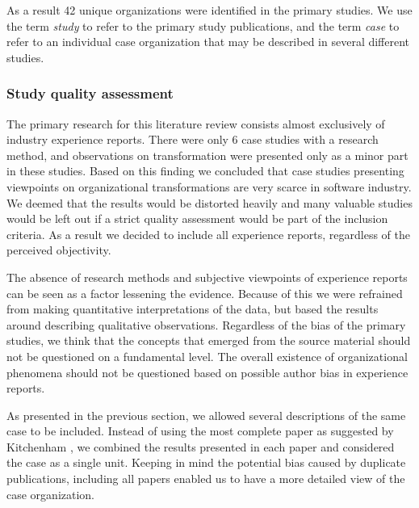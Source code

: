 As a result 42 unique organizations were identified in the primary studies. We
use the term \emph{study} to refer to the primary study publications, and the
term \emph{case} to refer to an individual case organization that may be
described in several different studies.


\subsubsection{Study quality assessment}

The primary research for this literature review consists almost exclusively of
industry experience reports. There were only 6 case studies with a research
method, and observations on transformation were presented only as a minor part
in these studies. Based on this finding we concluded that case studies
presenting viewpoints on organizational transformations are very scarce in
software industry. We deemed that the results would be distorted heavily and
many valuable studies would be left out if a strict quality assessment would be
part of the inclusion criteria. As a result we decided to include all experience
reports, regardless of the perceived objectivity.

The absence of research methods and subjective viewpoints of experience reports
can be seen as a factor lessening the evidence. Because of this we were
refrained from making quantitative interpretations of the data, but based the
results around describing qualitative observations. Regardless of the bias of
the primary studies, we think that the concepts that emerged from the source
material should not be questioned on a fundamental level. The overall existence
of organizational phenomena should not be questioned based on possible author
bias in experience reports.



% 

As presented in the previous section, we allowed several descriptions of the
same case to be included. Instead of using the most complete paper as suggested
by Kitchenham \cite{Kitchenham2007}, we combined the results presented in each
paper and considered the case as a single unit. Keeping in mind the potential
bias caused by duplicate publications, including all papers enabled us to have a
more detailed view of the case organization.


